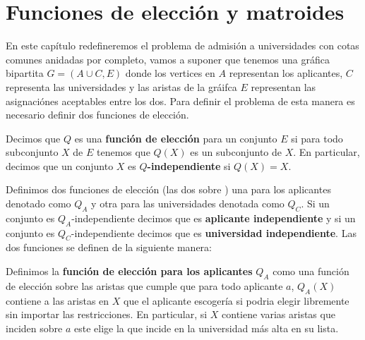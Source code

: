 \chapter{Funciones de elección y matroides}

En este capítulo redefineremos el problema de admisión a universidades con cotas comunes anidadas por completo, vamos a suponer que tenemos una gráfica bipartita $G=(A\cup C,E)$ donde los vertices en $A$ representan los aplicantes, $C$ representa las universidades y las aristas de la gráifca $E$ representan las asignaciónes aceptables entre los dos. Para definir el problema de esta manera es necesario definir dos funciones de elección. 

\begin{dfn}
Decimos que $Q$ es una \textbf{función de elección} para un conjunto $E$ si para todo subconjunto $X$ de $E$ tenemos que $Q(X)$ es un subconjunto de $X$.  En particular, decimos que un conjunto $X$ es \textbf{$Q$-independiente} si $Q(X)=X$.
\end{dfn}

Definimos dos funciones de elección (las dos sobre ) una para los aplicantes denotado como $Q_A$ y otra para las universidades denotada como $Q_C$. Si un conjunto es $Q_A$-independiente decimos que es \textbf{aplicante independiente} y si un conjunto es $Q_C$-independiente decimos que es \textbf{universidad independiente}. Las dos funciones se definen de la siguiente manera:

\begin{dfn}
Definimos la \textbf{función de elección para los aplicantes} $Q_A$ como una función de elección sobre las aristas que cumple que para todo aplicante $a$, $Q_A(X)$ contiene a las aristas en $X$ que el aplicante escogería si podria elegir libremente sin importar las restricciones. En particular, si $X$ contiene  varias aristas que inciden sobre $a$ este elige la que incide en la universidad más alta en su lista. 
\end{dfn} 

